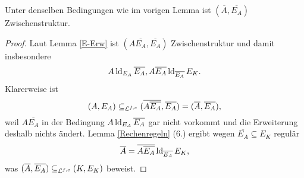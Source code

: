     \begin{lemma}\label{alg Abschl}
    	Unter denselben Bedingungen wie im vorigen Lemma ist $(\overline{A},\overline{E_A})$ Zwischenstruktur.
    \end{lemma}
    \begin{proof}
    	Laut Lemma \ref{E-Erw} ist $(A\overline{E_A},\overline{E_A})$ Zwischenstruktur und damit insbesondere $$A\operatorname{ld}_{E_A}\overline{E_A},A\overline{E_A}\operatorname{ld}_{\overline{E_A}}E_K.$$ Klarerweise ist $$(A,E_A)\subseteq_{\mathcal{L}^{f,c}}(\overline{A\overline{E_A}},\overline{E_A})=(\overline{A},\overline{E_A}),$$ weil $A\overline{E_A}$ in der Bedingung $A\operatorname{ld}_{E_A}\overline{E_A}$ gar nicht vorkommt und die Erweiterung deshalb nichts ändert.\newpage
    	Lemma \ref{Rechenregeln} (6.) ergibt wegen $\overline{E_A}\subseteq E_K$ regulär $$\overline{A}=\overline{A\overline{E_A}}\operatorname{ld}_{\overline{E_A}}E_K,$$ was $(\overline{A},\overline{E_A})\subseteq_{\mathcal{L}^{f,c}}(K,E_K)$ beweist.
    \end{proof}
    
